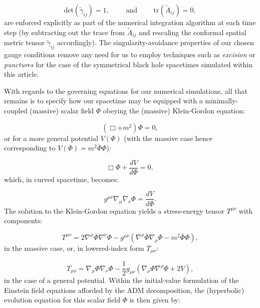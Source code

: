 \documentclass{article}
\begin{document}
\begin{equation}
\mathrm{det} \left( \tilde{\gamma}_{i j} \right) = 1, \qquad \text{ and } \qquad \mathrm{tr} \left( \tilde{A}_{i j} \right) = 0,
\end{equation}
are enforced explicitly as part of the numerical integration algorithm at each time step (by subtracting out the trace from ${\tilde{A}_{i j}}$ and rescaling the conformal spatial metric tensor ${\tilde{\gamma}_{i j}}$ accordingly). The singularity-avoidance properties of our chosen gauge conditions remove any need for us to employ techniques such as \textit{excision} or \textit{punctures} for the case of the symmetrical black hole spacetimes simulated within this article.

With regards to the governing equations for our numerical simulations, all that remains is to specify how our spacetime may be equipped with a minimally-coupled (massive) scalar field ${\Phi}$ obeying the (massive) Klein-Gordon equation:

\begin{equation}
\left( \Box + m^2 \right) \Phi = 0,
\end{equation}
or for a more general potential ${V \left( \Phi \right)}$ (with the massive case hence corresponding to ${V \left( \Phi \right) = m^2 \bar{\Phi} \Phi}$):

\begin{equation}
\Box \Phi + \frac{d V}{d \Phi} = 0,
\end{equation}
which, in curved spacetime, becomes:

\begin{equation}
g^{\mu \nu} \nabla_{\mu} \nabla_{\nu} \Phi = \frac{d V}{d \Phi}.
\end{equation}
The solution to the Klein-Gordon equation yields a stress-energy tensor ${T^{\mu \nu}}$ with components:

\begin{equation}
T^{\mu \nu} = 2 \nabla^{\mu} \bar{\Phi} \nabla^{\nu} \Phi - g^{\mu \nu} \left( \nabla^{\rho} \bar{\Phi} \nabla_{\rho} \Phi - m^2 \bar{\Phi} \Phi \right),
\end{equation}
in the massive case, or, in lowered-index form ${T_{\mu \nu}}$:

\begin{equation}
T_{\mu \nu} = \nabla_{\mu} \Phi \nabla_{\nu} \Phi - \frac{1}{2} g_{\mu \nu} \left( \nabla_{\rho} \Phi \nabla^{\rho} \Phi + 2 V \right),
\end{equation}
in the case of a general potential. Within the initial-value formulation of the Einstein field equations afforded by the ADM decomposition, the (hyperbolic) evolution equation for this scalar field ${\Phi}$ is then given by:
\end{document}
